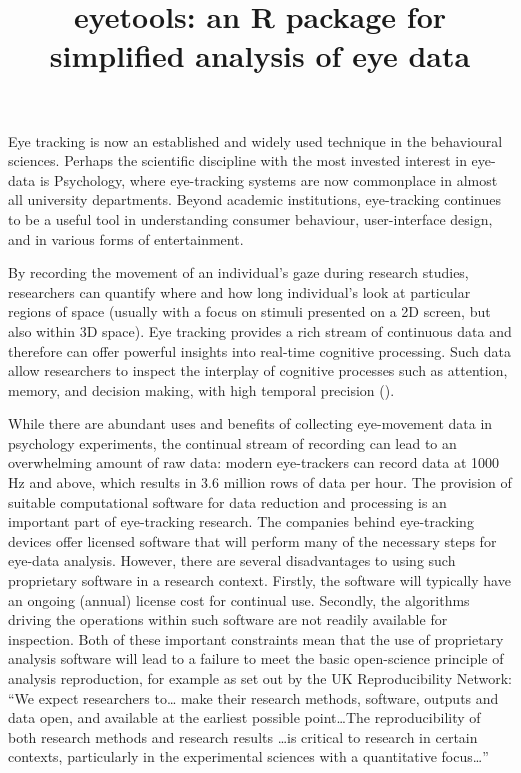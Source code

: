 \documentclass[
  man,
  floatsintext,
  longtable,
  nolmodern,
  notxfonts,
  notimes,
  colorlinks=true,linkcolor=blue,citecolor=blue,urlcolor=blue]{apa7}
\title{eyetools: an R package for simplified analysis of eye data}
\affiliation{
{Lancaster University}}
\begin{document}
\maketitle


\setcounter{secnumdepth}{-\maxdimen} %

\setlength\LTleft{0pt}

\resetlinenumber[1]

Eye tracking is now an established and widely used technique in the
behavioural sciences. Perhaps the scientific discipline with the most
invested interest in eye-data is Psychology, where eye-tracking systems
are now commonplace in almost all university departments. Beyond
academic institutions, eye-tracking continues to be a useful tool in
understanding consumer behaviour, user-interface design, and in various
forms of entertainment.

By recording the movement of an individual's gaze during research
studies, researchers can quantify where and how long individual's look
at particular regions of space (usually with a focus on stimuli
presented on a 2D screen, but also within 3D space). Eye tracking
provides a rich stream of continuous data and therefore can offer
powerful insights into real-time cognitive processing. Such data allow
researchers to inspect the interplay of cognitive processes such as
attention, memory, and decision making, with high temporal precision
().

While there are abundant uses and benefits of collecting eye-movement
data in psychology experiments, the continual stream of recording can
lead to an overwhelming amount of raw data: modern eye-trackers can
record data at 1000 Hz and above, which results in 3.6 million rows of
data per hour. The provision of suitable computational software for data
reduction and processing is an important part of eye-tracking research.
The companies behind eye-tracking devices offer licensed software that
will perform many of the necessary steps for eye-data analysis. However,
there are several disadvantages to using such proprietary software in a
research context. Firstly, the software will typically have an ongoing
(annual) license cost for continual use. Secondly, the algorithms
driving the operations within such software are not readily available
for inspection. Both of these important constraints mean that the use of
proprietary analysis software will lead to a failure to meet the basic
open-science principle of analysis reproduction, for example as set out
by the UK Reproducibility Network: ``We expect researchers to\ldots{}
make their research methods, software, outputs and data open, and
available at the earliest possible point\ldots The reproducibility of
both research methods and research results \ldots is critical to
research in certain contexts, particularly in the experimental sciences
with a quantitative focus\ldots{}''
\end{document}
